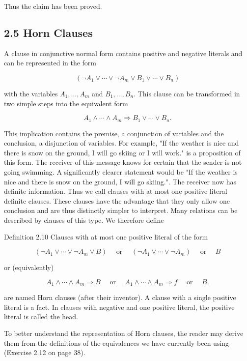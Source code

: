 \documentclass[10pt]{article}
\begin{document}
Thus the claim has been proved.

\subsection*{2.5 Horn Clauses}
A clause in conjunctive normal form contains positive and negative literals and can be represented in the form

$$
\left(\neg A_{1} \vee \cdots \vee \neg A_{m} \vee B_{1} \vee \cdots \vee B_{n}\right)
$$

with the variables $A_{1}, \ldots, A_{m}$ and $B_{1}, \ldots, B_{n}$. This clause can be transformed in two simple steps into the equivalent form

$$
A_{1} \wedge \cdots \wedge A_{m} \Rightarrow B_{1} \vee \cdots \vee B_{n} .
$$

This implication contains the premise, a conjunction of variables and the conclusion, a disjunction of variables. For example, "If the weather is nice and there is snow on the ground, I will go skiing or I will work." is a proposition of this form. The receiver of this message knows for certain that the sender is not going swimming. A significantly clearer statement would be "If the weather is nice and there is snow on the ground, I will go skiing.". The receiver now has definite information. Thus we call clauses with at most one positive literal definite clauses. These clauses have the advantage that they only allow one conclusion and are thus distinctly simpler to interpret. Many relations can be described by clauses of this type. We therefore define

Definition 2.10 Clauses with at most one positive literal of the form

$$
\left(\neg A_{1} \vee \cdots \vee \neg A_{m} \vee B\right) \quad \text { or } \quad\left(\neg A_{1} \vee \cdots \vee \neg A_{m}\right) \quad \text { or } \quad B
$$

or (equivalently)

$$
A_{1} \wedge \cdots \wedge A_{m} \Rightarrow B \quad \text { or } \quad A_{1} \wedge \cdots \wedge A_{m} \Rightarrow f \quad \text { or } \quad B .
$$

are named Horn clauses (after their inventor). A clause with a single positive literal is a fact. In clauses with negative and one positive literal, the positive literal is called the head.

To better understand the representation of Horn clauses, the reader may derive them from the definitions of the equivalences we have currently been using (Exercise 2.12 on page 38).
\end{document}
